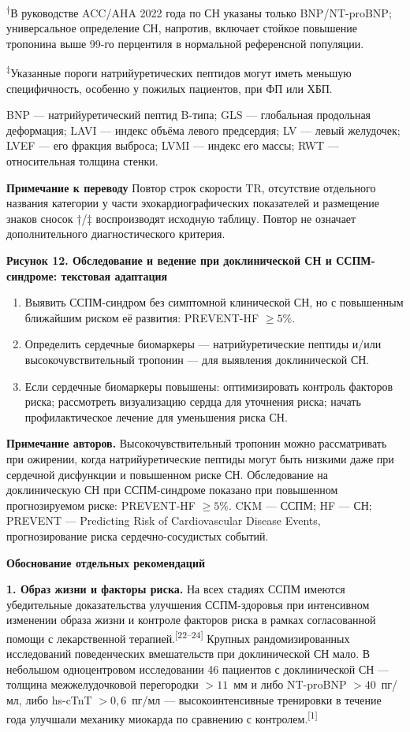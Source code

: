\documentclass[11pt,a4paper]{article}
\newcommand{\src}[1]{\textsuperscript{[#1]}}
\newcommand{\editorial}[1]{\par\begingroup\small\color{black!70}\textbf{Примечание к переводу} #1\par\endgroup}
\newcommand{\heading}[1]{\par\medskip\textbf{#1}\par}
\begin{document}
\textsuperscript{†}В руководстве ACC/AHA 2022 года по СН указаны только BNP/NT-proBNP; универсальное определение СН, напротив, включает стойкое повышение тропонина выше 99-го перцентиля в нормальной референсной популяции.

\textsuperscript{‡}Указанные пороги натрийуретических пептидов могут иметь меньшую специфичность, особенно у пожилых пациентов, при ФП или ХБП.

BNP --- натрийуретический пептид B-типа; GLS --- глобальная продольная деформация; LAVI --- индекс объёма левого предсердия; LV --- левый желудочек; LVEF --- его фракция выброса; LVMI --- индекс его массы; RWT --- относительная толщина стенки.
\editorial{Повтор строк скорости TR, отсутствие отдельного названия категории у части эхокардиографических показателей и размещение знаков сносок †/‡ воспроизводят исходную таблицу. Повтор не означает дополнительного диагностического критерия.}

\heading{Рисунок 12. Обследование и ведение при доклинической СН и ССПМ-синдроме: текстовая адаптация}
\begin{enumerate}
\item Выявить ССПМ-синдром без симптомной клинической СН, но с повышенным ближайшим риском её развития: PREVENT-HF $\geq5\%$.
\item Определить сердечные биомаркеры --- натрийуретические пептиды и/или высокочувствительный тропонин --- для выявления доклинической СН.
\item Если сердечные биомаркеры повышены: оптимизировать контроль факторов риска; рассмотреть визуализацию сердца для уточнения риска; начать профилактическое лечение для уменьшения риска СН.
\end{enumerate}
\textbf{Примечание авторов.} Высокочувствительный тропонин можно рассматривать при ожирении, когда натрийуретические пептиды могут быть низкими даже при сердечной дисфункции и повышенном риске СН. Обследование на доклиническую СН при ССПМ-синдроме показано при повышенном прогнозируемом риске: PREVENT-HF $\geq5\%$. CKM --- ССПМ; HF --- СН; PREVENT --- Predicting Risk of Cardiovascular Disease Events, прогнозирование риска сердечно-сосудистых событий.

\heading{Обоснование отдельных рекомендаций}
\textbf{1. Образ жизни и факторы риска.} На всех стадиях ССПМ имеются убедительные доказательства улучшения ССПМ-здоровья при интенсивном изменении образа жизни и контроле факторов риска в рамках согласованной помощи с лекарственной терапией.\src{22--24} Крупных рандомизированных исследований поведенческих вмешательств при доклинической СН мало. В небольшом одноцентровом исследовании 46 пациентов с доклинической СН --- толщина межжелудочковой перегородки $>11$~мм и либо NT-proBNP $>40$~пг/мл, либо hs-cTnT $>0{,}6$~пг/мл --- высокоинтенсивные тренировки в течение года улучшали механику миокарда по сравнению с контролем.\src{1}
\end{document}

